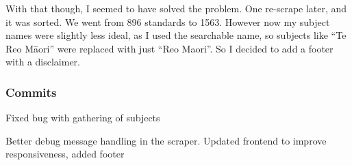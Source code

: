 \documentclass{article}
\begin{document}
With that though, I seemed to have solved the problem. One re-scrape later, and it was sorted. We went from 896 standards to 1563. However now my subject names were slightly less ideal, as I used the searchable name, so subjects like ``Te Reo M\={a}ori'' were replaced with just ``Reo Maori''. So I decided to add a footer with a disclaimer.
\subsubsection*{Commits}
\begin{description}\small
    \item[\texttt{292ed0b}] Fixed bug with gathering of subjects
    \item[\texttt{1a9ebbd}]  Better debug message handling in the scraper. Updated frontend to improve responsiveness, added footer
\end{description}
\normalfont
\end{document}
